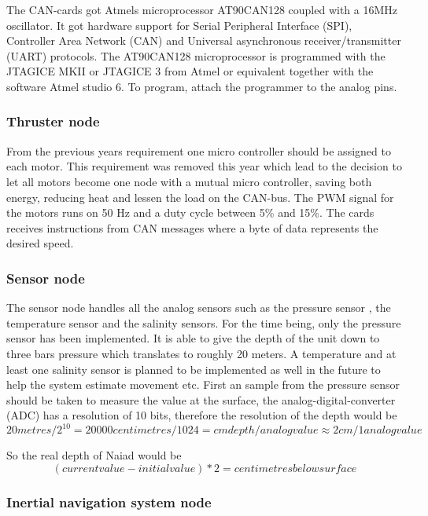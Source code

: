 The CAN-cards got Atmels microprocessor AT90CAN128 \cite{at90can128} coupled with a 16MHz oscillator. It got hardware support for Serial Peripheral Interface (SPI), Controller Area Network (CAN) and Universal asynchronous receiver/transmitter (UART) protocols. The AT90CAN128 microprocessor is programmed with the JTAGICE MKII\cite{JTAGICEMKII} or JTAGICE 3\cite{JTAGICE3} from Atmel or equivalent together with the software Atmel studio 6.
To program, attach the programmer to the analog pins. 
\subsubsection{Thruster node}
\noindent From the previous years requirement one micro controller should be assigned to each motor. This requirement was removed this year which lead to the decision to let all motors become one node with a mutual micro controller, saving both energy, reducing heat and lessen the load on the CAN-bus.
The PWM signal for the motors runs on 50 Hz and a duty cycle between 5\% and 15\%. The cards receives instructions from CAN messages where a byte of data represents the desired speed.

\subsubsection{Sensor node}
\noindent The sensor node handles all the analog sensors such as the pressure sensor \cite{Pressure_sensor}, the temperature sensor and the salinity sensors. For the time being, only the pressure sensor has been implemented. It is able to give the depth of the unit down to three bars pressure which translates to roughly 20 meters.
A temperature and at least one salinity sensor is planned to be implemented as well in the future to help the system estimate movement etc.
First an sample from the pressure sensor should be taken to measure the value at the surface, the analog-digital-converter (ADC) has a resolution of 10 bits, therefore the resolution of the depth would be 
\begin{equation}\label{first}
20 metres / 2^{10} = 20 000 centimetres / 1024 = cm depth / analog value \approx 2 cm / 1 analog value
\end{equation}


So the real depth of Naiad would be 
\begin{equation}\label{first}
(current value - initial value) * 2 = centimetres below surface
\end{equation}
\subsubsection{Inertial navigation system node}

